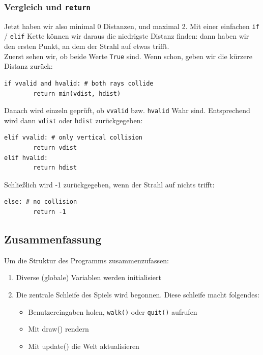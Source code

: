 \documentclass[a4paper,12pt]{report}
\begin{document}
\subsubsection{Vergleich und \texttt{return}}
Jetzt haben wir also minimal 0 Distanzen, und maximal 2. Mit einer einfachen \texttt{if} / \texttt{elif} Kette können wir daraus die niedrigste Distanz finden: dann haben wir den ersten Punkt, an dem der Strahl auf etwas trifft. \\
Zuerst sehen wir, ob beide Werte \texttt{True} sind. Wenn schon, geben wir die kürzere Distanz zurück:
\begin{Verbatim}[baselinestretch=1.0, xleftmargin=1cm]
if vvalid and hvalid: # both rays collide
        return min(vdist, hdist)
\end{Verbatim}
Danach wird einzeln geprüft, ob \texttt{vvalid} bzw. \texttt{hvalid} Wahr sind. Entsprechend wird dann \texttt{vdist} oder \texttt{hdist} zurückgegeben:
\begin{Verbatim}[baselinestretch=1.0, xleftmargin=1cm]
elif vvalid: # only vertical collision
        return vdist
elif hvalid:
        return hdist
\end{Verbatim}
Schließlich wird -1 zurückgegeben, wenn der Strahl auf nichts trifft:
\begin{Verbatim}[baselinestretch=1.0, xleftmargin=1cm]
else: # no collision
        return -1
\end{Verbatim}

\subsection{Zusammenfassung}

Um die Struktur des Programms zusammenzufassen:
\begin{spacing}{1.0}
\begin{framed}
\begin{enumerate}
	\item Diverse (globale) Variablen werden initialisiert
	\item Die zentrale Schleife des Spiels wird begonnen. Diese schleife macht folgendes:
	\begin{itemize}
		\item Benutzereingaben holen, \texttt{walk()} oder \texttt{quit()} aufrufen
		\item Mit draw() rendern
		\item Mit update() die Welt aktualisieren
	\end{itemize}
\end{enumerate}
\end{framed}
\end{spacing}
\end{document}
